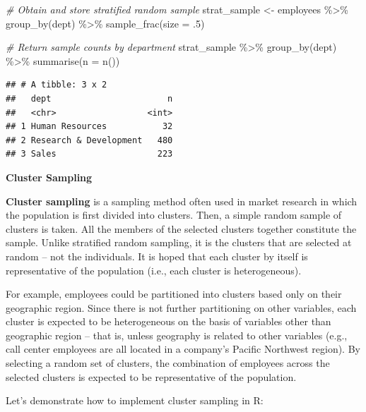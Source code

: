 \documentclass[
]{book}
\newenvironment{Shaded}{\begin{snugshade}}{\end{snugshade}}
\newcommand{\AttributeTok}[1]{\textcolor[rgb]{0.77,0.63,0.00}{#1}}
\newcommand{\CommentTok}[1]{\textcolor[rgb]{0.56,0.35,0.01}{\textit{#1}}}
\newcommand{\DecValTok}[1]{\textcolor[rgb]{0.00,0.00,0.81}{#1}}
\newcommand{\FunctionTok}[1]{\textcolor[rgb]{0.00,0.00,0.00}{#1}}
\newcommand{\NormalTok}[1]{#1}
\newcommand{\OtherTok}[1]{\textcolor[rgb]{0.56,0.35,0.01}{#1}}
\newcommand{\SpecialCharTok}[1]{\textcolor[rgb]{0.00,0.00,0.00}{#1}}
\begin{document}
\begin{Shaded}
\begin{Highlighting}[]
\CommentTok{\# Obtain and store stratified random sample}
\NormalTok{strat\_sample }\OtherTok{\textless{}{-}}\NormalTok{ employees }\SpecialCharTok{\%\textgreater{}\%}
                \FunctionTok{group\_by}\NormalTok{(dept) }\SpecialCharTok{\%\textgreater{}\%}
                \FunctionTok{sample\_frac}\NormalTok{(}\AttributeTok{size =}\NormalTok{ .}\DecValTok{5}\NormalTok{)}

\CommentTok{\# Return sample counts by department}
\NormalTok{strat\_sample }\SpecialCharTok{\%\textgreater{}\%}
\FunctionTok{group\_by}\NormalTok{(dept) }\SpecialCharTok{\%\textgreater{}\%}
\FunctionTok{summarise}\NormalTok{(}\AttributeTok{n =} \FunctionTok{n}\NormalTok{())}
\end{Highlighting}
\end{Shaded}

\begin{verbatim}
## # A tibble: 3 x 2
##   dept                       n
##   <chr>                  <int>
## 1 Human Resources           32
## 2 Research & Development   480
## 3 Sales                    223
\end{verbatim}

\textbf{Cluster Sampling}

\textbf{Cluster sampling} is a sampling method often used in market research in which the population is first divided into clusters. Then, a simple random sample of clusters is taken. All the members of the selected clusters together constitute the sample. Unlike stratified random sampling, it is the clusters that are selected at random -- not the individuals. It is hoped that each cluster by itself is representative of the population (i.e., each cluster is heterogeneous).

For example, employees could be partitioned into clusters based only on their geographic region. Since there is not further partitioning on other variables, each cluster is expected to be heterogeneous on the basis of variables other than geographic region -- that is, unless geography is related to other variables (e.g., call center employees are all located in a company's Pacific Northwest region). By selecting a random set of clusters, the combination of employees across the selected clusters is expected to be representative of the population.

Let's demonstrate how to implement cluster sampling in R:
\end{document}

